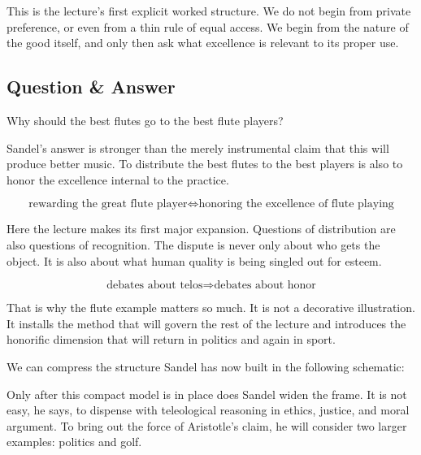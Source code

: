 This is the lecture's first explicit worked structure. We do not begin from private preference, or even from a thin rule of equal access. We begin from the nature of the good itself, and only then ask what excellence is relevant to its proper use.

\subsection{Question \& Answer}

Why should the best flutes go to the best flute players?

Sandel's answer is stronger than the merely instrumental claim that this will produce better music. To distribute the best flutes to the best players is also to honor the excellence internal to the practice.

\begin{equation}
\text{rewarding the great flute player}
\Longleftrightarrow
\text{honoring the excellence of flute playing}
\end{equation}

Here the lecture makes its first major expansion. Questions of distribution are also questions of recognition. The dispute is never only about who gets the object. It is also about what human quality is being singled out for esteem.

\begin{equation}
\text{debates about telos}
\Longrightarrow
\text{debates about honor}
\end{equation}

That is why the flute example matters so much. It is not a decorative illustration. It installs the method that will govern the rest of the lecture and introduces the honorific dimension that will return in politics and again in sport.

We can compress the structure Sandel has now built in the following schematic:

\begin{figure}
\centering
{}
\end{figure}

Only after this compact model is in place does Sandel widen the frame. It is not easy, he says, to dispense with teleological reasoning in ethics, justice, and moral argument. To bring out the force of Aristotle's claim, he will consider two larger examples: politics and golf.

